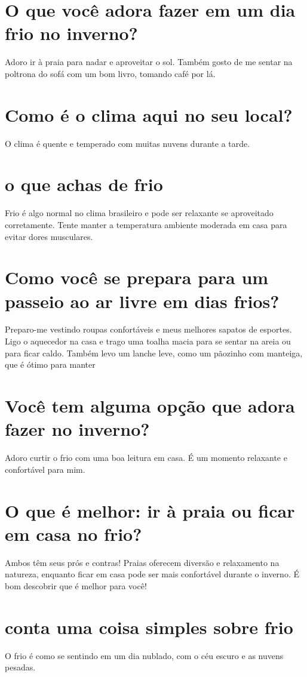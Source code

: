 \documentclass[11pt,a4paper]{article}
\begin{document}
\section{O que você adora fazer em um dia frio no inverno?}
Adoro ir à praia para nadar e aproveitar o sol. Também gosto de me sentar na poltrona do sofá com um bom livro, tomando café por lá.

\section{Como é o clima aqui no seu local?}
O clima é quente e temperado com muitas nuvens durante a tarde.

\section{o que achas de frio}
Frio é algo normal no clima brasileiro e pode ser relaxante se aproveitado corretamente. Tente manter a temperatura ambiente moderada em casa para evitar dores musculares.

\section{Como você se prepara para um passeio ao ar livre em dias frios?}
Preparo-me vestindo roupas confortáveis e meus melhores sapatos de esportes. Ligo o aquecedor na casa e trago uma toalha macia para se sentar na areia ou para ficar caldo. Também levo um lanche leve, como um pãozinho com manteiga, que é ótimo para manter

\section{Você tem alguma opção que adora fazer no inverno?}
Adoro curtir o frio com uma boa leitura em casa. É um momento relaxante e confortável para mim.

\section{O que é melhor: ir à praia ou ficar em casa no frio?}
Ambos têm seus prós e contras! Praias oferecem diversão e relaxamento na natureza, enquanto ficar em casa pode ser mais confortável durante o inverno. É bom descobrir que é melhor para você!

\section{conta uma coisa simples sobre frio}
O frio é como se sentindo em um dia nublado, com o céu escuro e as nuvens pesadas.
\end{document}
